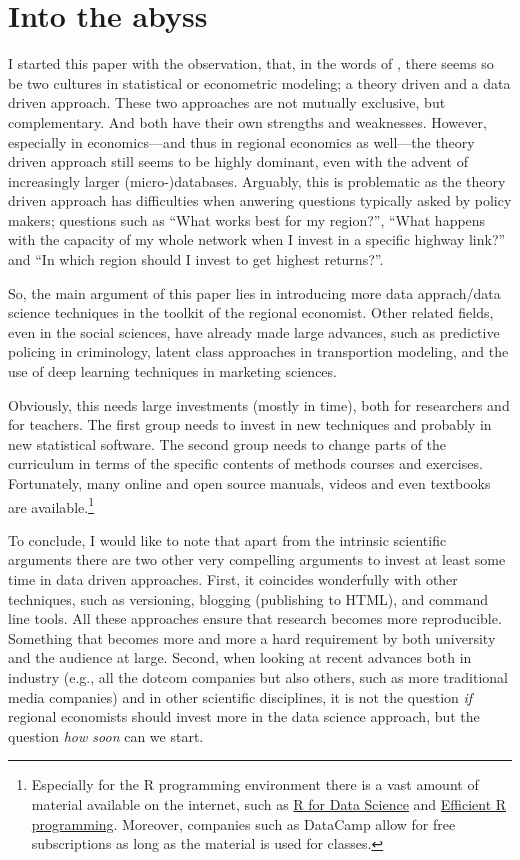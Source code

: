\documentclass[fleqn,10pt]{SelfArx} %
\begin{document}
\citet{schwabish2014economist}

\section{Into the abyss}

I started this paper with the observation, that, in the words of
\citet{breiman2001statistical}, there seems so be two cultures in statistical or
econometric modeling; a theory driven and a data driven approach. These two
approaches are not mutually exclusive, but complementary. And both have their
own strengths and weaknesses. However, especially in economics---and thus in
regional economics as well---the theory driven approach still seems to be highly
dominant, even with the advent of increasingly larger (micro-)databases.
Arguably, this is problematic as the theory driven approach has difficulties when anwering questions typically
asked by policy makers; questions such as ``What works best for my region?'',
``What happens with the capacity of my whole network when I invest in a specific
highway link?'' and ``In which region should I invest to get highest returns?''.

So, the main argument of this paper lies in introducing more data apprach/data
science techniques in the toolkit of the regional economist. Other related fields, even
in the social sciences, have already made large advances, such as predictive
policing in criminology, latent class approaches in transportion modeling, and
the use of deep learning techniques in marketing sciences. 

Obviously, this needs large investments (mostly in time), both for researchers
and for teachers. The first group needs to invest in new techniques and probably
in new statistical software. The second group needs to change parts of the
curriculum in terms of the specific contents of methods courses and exercises.
Fortunately, many online and open source manuals, videos and even textbooks are
available.\footnote{Especially for the R programming environment \citep{R2017}  there is a vast amount of
  material available on the internet, such as \href{http://r4ds.had.co.nz/}{R for Data Science}
  and \href{https://csgillespie.github.io/efficientR/}{Efficient R programming}.
Moreover, companies such as DataCamp allow for free subscriptions as long as the
material is used for classes.} 

To conclude, I would like to note that apart from the intrinsic scientific
arguments there are two other very compelling arguments to invest at least some
time in data driven approaches. First, it coincides wonderfully with other
techniques, such as versioning, blogging (publishing to HTML), and command line
tools. All these approaches ensure that research becomes more reproducible.
Something that becomes more and more a hard requirement by both university and
the audience at large. Second, when looking at recent advances both in industry
(e.g., all the dotcom companies but also others, such as more traditional media
companies) and in other scientific disciplines, it is not the question \emph{if} regional economists
should invest more in the data science approach, but the question \emph{how
  soon} can we start.  
\end{document}
